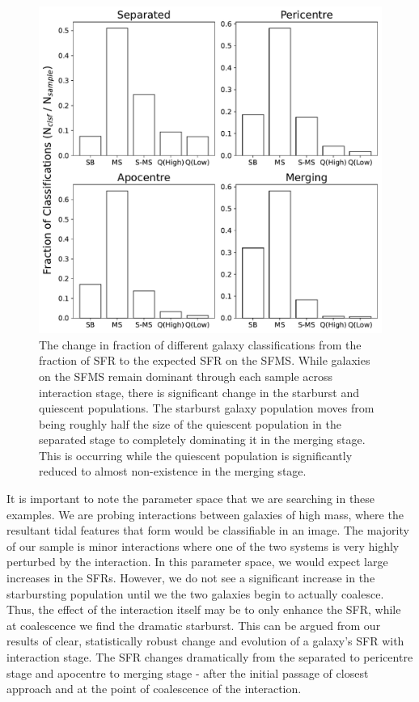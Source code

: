 \begin{figure}
    \centering
    \includegraphics[width=\textwidth]{Chapter3/figures/sfr-clsf-bar.pdf}
    \caption[The change in fraction of different galaxy classifications from the fraction of SFR to the expected SFR on the SFMS.]{The change in fraction of different galaxy classifications from the fraction of SFR to the expected SFR on the SFMS. While galaxies on the SFMS remain dominant through each sample across interaction stage, there is significant change in the starburst and quiescent populations. The starburst galaxy population moves from being roughly half the size of the quiescent population in the separated stage to completely dominating it in the merging stage. This is occurring while the quiescent population is significantly reduced to almost non-existence in the merging stage.}
    \label{fig:sfr-clsf-bar}
\end{figure}

It is important to note the parameter space that we are searching in these examples. We are probing interactions between galaxies of high mass, where the resultant tidal features that form would be classifiable in an image. The majority of our sample is minor interactions where one of the two systems is very highly perturbed by the interaction. In this parameter space, we would expect large increases in the SFRs. However, we do not see a significant increase in the starbursting population until we the two galaxies begin to actually coalesce. Thus, the effect of the interaction itself may be to only enhance the SFR, while at coalescence we find the dramatic starburst. This can be argued from our results of clear, statistically robust change and evolution of a galaxy's SFR with interaction stage. The SFR changes dramatically from the separated to pericentre stage and apocentre to merging stage - after the initial passage of closest approach and at the point of coalescence of the interaction.

